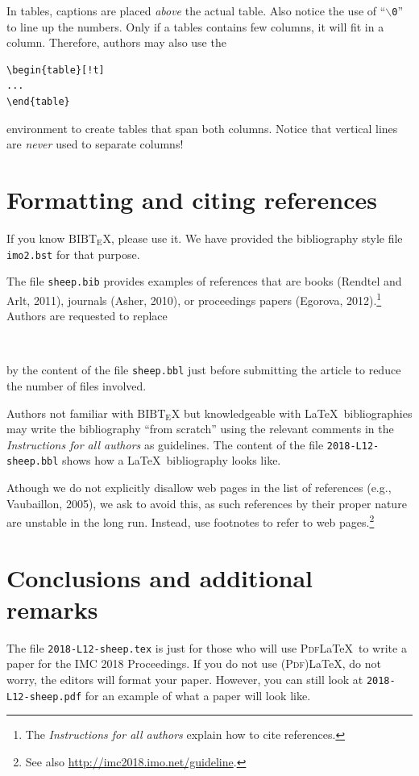 \documentclass[10pt,a4paper,twoside]{article}
\begin{document}
\begin{IMCpaper}
In tables, captions are placed \emph{above\/} the actual table. Also
notice the use of ``\texttt{$\backslash$0}'' to line up the
numbers. Only if a tables contains few columns, it will fit in a
column. Therefore, authors may also use the
%
\begin{verbatim}
\begin{table}[!t]
...
\end{table}
\end{verbatim}
%
environment to create tables that span both columns.  Notice that
vertical lines are \emph{never\/} used to separate columns!

\section{Formatting and citing references}
If you know $\mathrm{B{\scriptstyle{IB}}\!T\!_{\displaystyle E}\!X}$,
please use it. We have provided the bibliography style file
\texttt{imo2.bst} for that purpose.

The file \texttt{sheep.bib} provides examples of
references that are books (Rendtel and Arlt, 2011), journals (Asher,
2010), or proceedings papers (Egorova, 2012).\footnote{The
  \textit{Instructions for all authors\/} explain how to cite references.}
Authors are requested to replace
%
\begin{verbatim}


\end{verbatim}
%
by the content of the file \texttt{sheep.bbl} just before submitting
the article to reduce the number of files involved.

Authors not familiar with
$\mathrm{B{\scriptstyle{IB}}\!T\!_{\displaystyle E}\!X}$ but
knowledgeable with \LaTeX\ bibliographies may write the bibliography
``from scratch'' using the relevant comments in the \emph{Instructions
  for all authors\/} as guidelines. The content of the file
\texttt{2018-L12-sheep.bbl} shows how a \LaTeX\ bibliography looks
like.

Athough we do not explicitly disallow web pages in the list of
references (e.g., Vaubaillon, 2005), we ask to avoid this, as such
references by their proper nature are unstable in the long
run. Instead, use footnotes to refer to web pages.\footnote{See also
  \url{http://imc2018.imo.net/guideline}.}

\section{Conclusions and additional remarks}
The file \texttt{2018-L12-sheep.tex} is just for those who will use
\textsc{Pdf}\LaTeX\ to write a paper for the IMC 2018 Proceedings.  If
you do not use (\textsc{Pdf})\LaTeX, do not worry, the editors will
format your paper.  However, you can still look at
\texttt{2018-L12-sheep.pdf} for an example of what a paper will look
like.


\end{IMCpaper}
\end{document}
